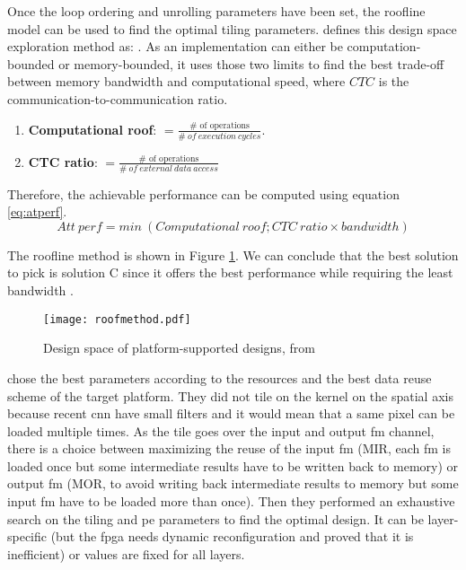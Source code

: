 Once the loop ordering and unrolling parameters have been set, the roofline model can be used to find the optimal tiling parameters. \textcite{mittal_survey_2020} defines this design space exploration method as: . As an implementation can either be computation-bounded or memory-bounded, it uses those two limits to find the best trade-off between memory bandwidth and computational speed, where $CTC$ is the communication-to-communication ratio.
\begin{enumerate}
    \item \textbf{Computational roof}: $= \frac{\text{\# \ of \ operations}}{\# \ of \ execution \ cycles}$.
    \item \textbf{CTC ratio}: $= \frac{\text{\# \ of \ operations}}{\# \ of \ external \ data \ access}$
\end{enumerate}
Therefore, the achievable performance can be computed using equation \ref{eq:atperf}.
\begin{equation}
Att \ perf = min \ (Computational \ roof; CTC \ ratio \times bandwidth)
\label{eq:atperf}
\end{equation}

The roofline method is shown in Figure \ref{fig:roofmeth}. We can conclude that the best solution to pick is solution C since it offers the best performance while requiring the least bandwidth \cite{zhang_optimizing_2015}.
%
\begin{figure}[H]
    \centering
    \texttt{[image: roofmethod.pdf]}
    \caption{Design space of platform-supported designs, from \cite{zhang_optimizing_2015}}
    \label{fig:roofmeth}
\end{figure}

\textcite{motamedi_placid_2017} chose the best parameters according to the resources and the best data reuse scheme of the target platform. They did not tile on the kernel on the spatial axis because recent \acrshort{cnn} have small filters and it would mean that a same pixel can be loaded multiple times. As the tile goes over the input and output \acrshort{fm} channel, there is a choice between maximizing the reuse of the input \acrshort{fm} (MIR, each \acrshort{fm} is loaded once but some intermediate results have to be written back to memory) or output \acrshort{fm} (MOR, to avoid writing back intermediate results to memory but some input \acrshort{fm} have to be loaded more than once). Then they performed an exhaustive search on the tiling and \acrshort{pe} parameters to find the optimal design. It can be layer-specific (but the \acrshort{fpga} needs dynamic reconfiguration and \textcite{zhang_optimizing_2015} proved that it is inefficient) or values are fixed for all layers.

